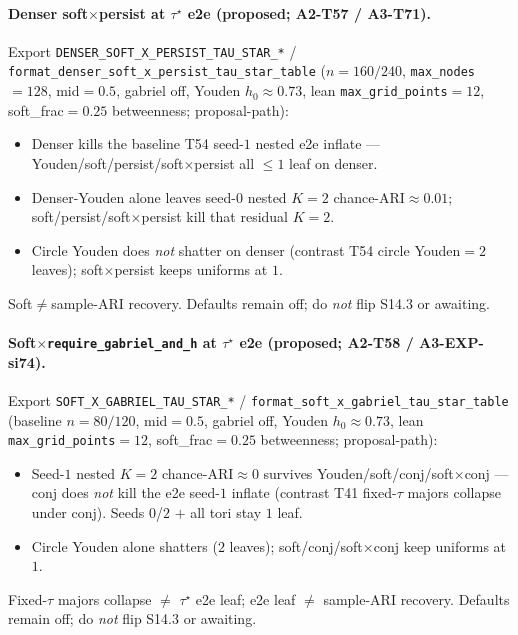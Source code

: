 \documentclass[11pt]{article}
\begin{document}
\paragraph{Denser soft$\times$persist at $\tau^\star$ e2e (proposed;
A2-T57 / A3-T71).}
Export \texttt{DENSER\_SOFT\_X\_PERSIST\_TAU\_STAR\_*} /
\texttt{format\_denser\_soft\_x\_persist\_tau\_star\_table}
($n{=}160/240$, \texttt{max\_nodes}${=}128$, mid${=}0.5$, gabriel off,
Youden $h_0\approx 0.73$, lean \texttt{max\_grid\_points}${=}12$,
soft\_frac${=}0.25$ betweenness; proposal-path):
\begin{itemize}[leftmargin=1.5em]
  \item Denser kills the baseline T54 seed-$1$ nested e2e inflate ---
  Youden/soft/persist/soft$\times$persist all $\le 1$ leaf on denser.
  \item Denser-Youden alone leaves seed-$0$ nested $K{=}2$
  chance-ARI$\approx 0.01$; soft/persist/soft$\times$persist kill that
  residual $K{=}2$.
  \item Circle Youden does \emph{not} shatter on denser (contrast T54
  circle Youden${=}2$ leaves); soft$\times$persist keeps uniforms at $1$.
\end{itemize}
Soft$\neq$sample-ARI recovery. Defaults remain off; do \emph{not} flip
S14.3 or awaiting.

\paragraph{Soft$\times$\texttt{require\_gabriel\_and\_h} at $\tau^\star$ e2e
(proposed; A2-T58 / A3-EXP-si74).}
Export \texttt{SOFT\_X\_GABRIEL\_TAU\_STAR\_*} /
\texttt{format\_soft\_x\_gabriel\_tau\_star\_table}
(baseline $n{=}80/120$, mid${=}0.5$, gabriel off, Youden $h_0\approx 0.73$,
lean \texttt{max\_grid\_points}${=}12$, soft\_frac${=}0.25$ betweenness;
proposal-path):
\begin{itemize}[leftmargin=1.5em]
  \item Seed-$1$ nested $K{=}2$ chance-ARI$\approx 0$ survives
  Youden/soft/conj/soft$\times$conj --- conj does \emph{not} kill the
  e2e seed-$1$ inflate (contrast T41 fixed-$\tau$ majors collapse under
  conj). Seeds $0$/$2$ $+$ all tori stay $1$ leaf.
  \item Circle Youden alone shatters ($2$ leaves);
  soft/conj/soft$\times$conj keep uniforms at $1$.
\end{itemize}
Fixed-$\tau$ majors collapse $\neq$ $\tau^\star$ e2e leaf; e2e leaf $\neq$
sample-ARI recovery. Defaults remain off; do \emph{not} flip S14.3 or
awaiting.
\end{document}
